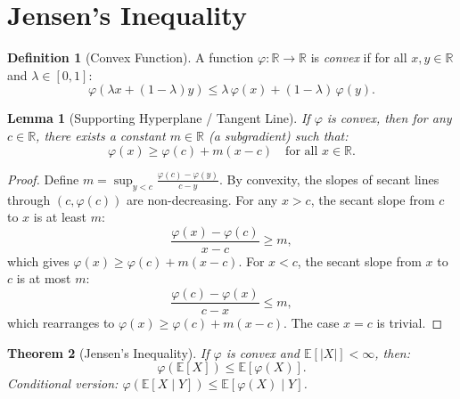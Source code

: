 \documentclass[11pt,a4paper]{article}
\theoremstyle{definition}
\newtheorem{definition}{Definition}[section]
\theoremstyle{plain}
\newtheorem{theorem}{Theorem}[section]
\newtheorem{lemma}[theorem]{Lemma}
\theoremstyle{remark}
\newcommand{\E}{\mathbb{E}}
\newcommand{\R}{\mathbb{R}}
\begin{document}
\section{Jensen's Inequality}
\label{sec:jensen}

\begin{definition}[Convex Function]
\label{def:convex}
A function $\varphi: \R \to \R$ is \emph{convex} if for all $x, y \in \R$ and $\lambda \in [0,1]$:
\begin{equation}
    \varphi(\lambda x + (1-\lambda) y) \leq \lambda\, \varphi(x) + (1-\lambda)\, \varphi(y).
    \label{eq:convex_def}
\end{equation}
\end{definition}

\begin{lemma}[Supporting Hyperplane / Tangent Line]
\label{lem:supporting}
If $\varphi$ is convex, then for any $c \in \R$, there exists a constant $m \in \R$ (a subgradient) such that:
\begin{equation}
    \varphi(x) \geq \varphi(c) + m(x - c) \quad \text{for all } x \in \R.
    \label{eq:supporting}
\end{equation}
\end{lemma}

\begin{proof}
Define $m = \sup_{y < c} \frac{\varphi(c) - \varphi(y)}{c - y}$. By convexity, the slopes of secant lines through $(c, \varphi(c))$ are non-decreasing. For any $x > c$, the secant slope from $c$ to $x$ is at least $m$:
\begin{equation}
    \frac{\varphi(x) - \varphi(c)}{x - c} \geq m,
\end{equation}
which gives $\varphi(x) \geq \varphi(c) + m(x - c)$. For $x < c$, the secant slope from $x$ to $c$ is at most $m$:
\begin{equation}
    \frac{\varphi(c) - \varphi(x)}{c - x} \leq m,
\end{equation}
which rearranges to $\varphi(x) \geq \varphi(c) + m(x - c)$. The case $x = c$ is trivial.
\end{proof}

\begin{keyresult}
\begin{theorem}[Jensen's Inequality]
\label{thm:jensen}
If $\varphi$ is convex and $\E[|X|] < \infty$, then:
\begin{equation}
    \varphi\!\left(\E[X]\right) \leq \E[\varphi(X)].
    \label{eq:jensen}
\end{equation}
Conditional version: $\varphi\!\left(\E[X \mid Y]\right) \leq \E[\varphi(X) \mid Y]$.
\end{theorem}
\end{keyresult}
\end{document}
